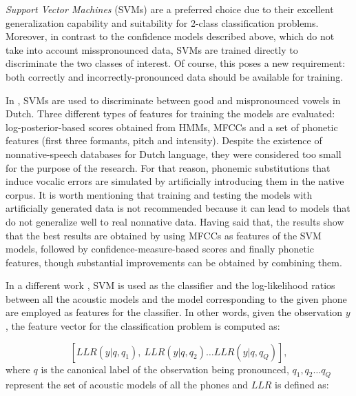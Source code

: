 \textit{Support Vector Machines} (SVMs) are a preferred choice
due to their excellent generalization capability and suitability for 2-class classification
problems. Moreover, in contrast to the confidence models described above, which do not take into
account misspronounced data, SVMs are trained directly to discriminate the two classes of interest.
Of course, this poses a new requirement: both correctly and incorrectly-pronounced data should be
available for training.

In \cite{detection_mispronunciation_dutch_vowel}, SVMs are used to discriminate
between good and mispronounced vowels in Dutch.
Three different types of features for training the models are evaluated: log-posterior-based
scores obtained from HMMs, MFCCs and a set of
phonetic features (first three formants, pitch and intensity). Despite the existence of nonnative-speech
databases for Dutch language, they were considered too small for the purpose of the research.
For that reason, phonemic
substitutions that induce vocalic errors are simulated by artificially introducing them in the native corpus. It is worth mentioning that training
and testing the models with artificially generated data is not recommended
because it can lead to models that do not generalize well to real nonnative data.
Having said that, the results show that the best
results are obtained by using MFCCs as features of the SVM models, followed by confidence-measure-based
scores and finally phonetic
features, though substantial improvements can be obtained by combining them.

In a different work \cite{svm_space_models}, SVM is used as the classifier and the
log-likelihood ratios between all the acoustic models and the model corresponding to the given
phone are employed as features for the classifier. In other words, given the observation
$y$, the feature vector for the classification problem is computed as:

\begin{equation}
\label{eq:psm}
[LLR(y|q,q_{1}), \ LLR(y|q,q_{2}) \dotsc LLR(y|q, q_{Q})],
\end{equation}
where $q$ is the canonical label of the observation being pronounced, {$q_{1}, q_{2}
\dotsc q_{Q}$} represent the set of acoustic models of all the phones and $LLR$ is defined as:

